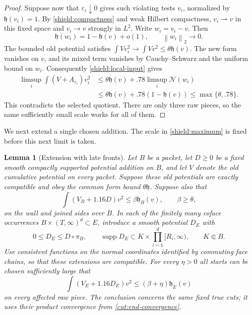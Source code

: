 \documentclass[11pt]{article}
\numberwithin{equation}{section}
\newtheorem{lemma}[theorem]{Lemma}
\theoremstyle{definition}
\theoremstyle{remark}
\begin{document}
\begin{proof}
Suppose now that $\varepsilon_i\downarrow0$ gives such violating tests $v_i$,
normalized by $\mathfrak h(v_i)=1$.  By \cref{shield:compactness} and
weak Hilbert compactness, $v_i\rightharpoonup v$ in this fixed space and
$v_i\to v$ strongly in $L^2$.  Write $w_i=v_i-v$.  Then
\[
 \mathfrak h(w_i)=1-\mathfrak h(v)+o(1),\qquad \left\lVert{w_i}\right\rVert_2\to0.
\]
The bounded old potential satisfies
$\int Vv_i^2\to\int Vv^2\le\theta\mathfrak h(v)$.  The new form
vanishes on $v$, and its mixed term vanishes by Cauchy--Schwarz and the
uniform bound on $w_i$.  Consequently \cref{shield:local-input} gives
\begin{align*}
 \limsup_i\int(V+A_{\varepsilon_i})v_i^2
 &\le\theta\mathfrak h(v)+.78\limsup_i\mathcal N(w_i)\\
 &\le\theta\mathfrak h(v)+.78(1-\mathfrak h(v))
 \le\max\{\theta,.78\}.
\end{align*}
This contradicts the selected quotient.  There are only three raw
pieces, so the same sufficiently small scale works for all of them.
\end{proof}

We next extend a single chosen addition.  The scale in
\cref{shield:maximum} is fixed before this next limit is taken.

\begin{lemma}[Extension with late fronts]\label{shield:extension}
Let $B$ be a packet, let $D\ge0$ be a fixed smooth compactly supported
potential addition on $B$, and let $V$ denote the old cumulative
potential on every packet.  Suppose these old potentials are exactly
compatible and obey the common form bound $\theta\mathfrak h$.
Suppose also that
\[
 \int(V_B+1.16D)v^2\le\beta\mathfrak h_B(v),\qquad \beta\ge\theta,
\]
on the wall and joined sides over $B$.  In each of the finitely many
coface occurrences $B\times(T,\infty)^d\subset E$, introduce a smooth
potential $D_E$ with
\begin{equation}\label{shield:extension-support}
 0\le D_E\le D\circ\pi_B,\qquad
 \operatorname{supp} D_E\subset K\times\prod_{i=1}^d[R_i,\infty),
 \qquad K\Subset B.
\end{equation}
Use consistent functions on the normal coordinates identified by
commuting face chains, so that these extensions are compatible.
For every $\eta>0$ all starts can be chosen sufficiently large that
\begin{equation}\label{shield:extended-bound}
 \int(V_E+1.16D_E)v^2\le(\beta+\eta)\mathfrak h_E(v)
\end{equation}
on every affected raw piece.  The conclusion concerns the same fixed
true cuts; it uses their product convergence from
\cref{cut:end-convergence}.
\end{lemma}
\end{document}
